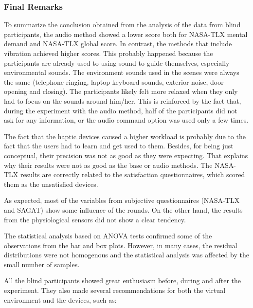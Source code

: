 \subsubsection*{Final Remarks}

To summarize the conclusion obtained from the analysis of the data from blind participants, the audio method showed a lower score both for NASA-TLX mental demand and NASA-TLX global score. In contrast, the methods that include vibration achieved higher scores. This probably happened because the participants are already used to using sound to guide themselves, especially environmental sounds. The environment sounds used in the scenes were always the same (telephone ringing, laptop keyboard sounds, exterior noise, door opening and closing). The participants likely felt more relaxed when they only had to focus on the sounds around him/her. This is reinforced by the fact that, during the experiment with the audio method, half of the participants did not ask for any information, or the audio command option was used only a few times.

The fact that the haptic devices caused a higher workload is probably due to the fact that the users had to learn and get used to them. Besides, for being just conceptual, their precision was not as good as they were expecting. That explains why their results were not as good as the base or audio methods. The NASA-TLX results are correctly related to the satisfaction questionnaires, which scored them as the unsatisfied devices.

As expected, most of the variables from subjective questionnaires (NASA-TLX and SAGAT) show some influence of the rounds. On the other hand, the results from the physiological sensors did not show a clear tendency. 

The statistical analysis based on ANOVA tests confirmed some of the observations from the bar and box plots. However, in many cases, the residual distributions were not homogenous and the statistical analysis was affected by the small number of samples. 

All the blind participants showed great enthusiasm before, during and after the experiment. They also made several recommendations for both the virtual environment and the devices, such as:

